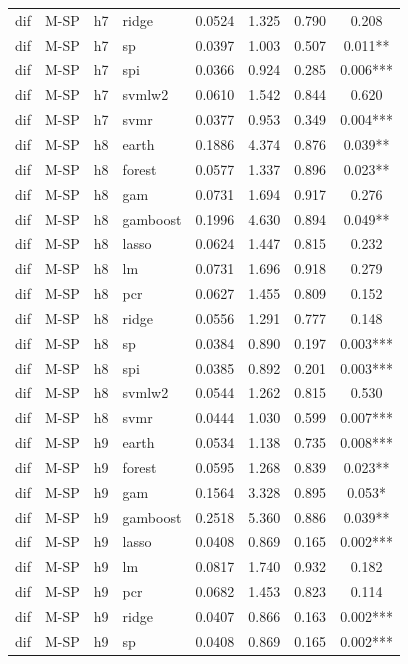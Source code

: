 \begin{ThreePartTable}
\begin{longtable}[t]{llclcccc}
dif & M-SP & h7 & ridge & 0.0524 & 1.325 & 0.790 & 0.208\\
dif & M-SP & h7 & sp & 0.0397 & 1.003 & 0.507 & 0.011**\\
dif & M-SP & h7 & spi & 0.0366 & 0.924 & 0.285 & 0.006***\\
dif & M-SP & h7 & svmlw2 & 0.0610 & 1.542 & 0.844 & 0.620\\
dif & M-SP & h7 & svmr & 0.0377 & 0.953 & 0.349 & 0.004***\\
\addlinespace
dif & M-SP & h8 & earth & 0.1886 & 4.374 & 0.876 & 0.039**\\
dif & M-SP & h8 & forest & 0.0577 & 1.337 & 0.896 & 0.023**\\
dif & M-SP & h8 & gam & 0.0731 & 1.694 & 0.917 & 0.276\\
dif & M-SP & h8 & gamboost & 0.1996 & 4.630 & 0.894 & 0.049**\\
dif & M-SP & h8 & lasso & 0.0624 & 1.447 & 0.815 & 0.232\\
dif & M-SP & h8 & lm & 0.0731 & 1.696 & 0.918 & 0.279\\
dif & M-SP & h8 & pcr & 0.0627 & 1.455 & 0.809 & 0.152\\
dif & M-SP & h8 & ridge & 0.0556 & 1.291 & 0.777 & 0.148\\
dif & M-SP & h8 & sp & 0.0384 & 0.890 & 0.197 & 0.003***\\
dif & M-SP & h8 & spi & 0.0385 & 0.892 & 0.201 & 0.003***\\
dif & M-SP & h8 & svmlw2 & 0.0544 & 1.262 & 0.815 & 0.530\\
dif & M-SP & h8 & svmr & 0.0444 & 1.030 & 0.599 & 0.007***\\
\addlinespace
dif & M-SP & h9 & earth & 0.0534 & 1.138 & 0.735 & 0.008***\\
dif & M-SP & h9 & forest & 0.0595 & 1.268 & 0.839 & 0.023**\\
dif & M-SP & h9 & gam & 0.1564 & 3.328 & 0.895 & 0.053*\\
dif & M-SP & h9 & gamboost & 0.2518 & 5.360 & 0.886 & 0.039**\\
dif & M-SP & h9 & lasso & 0.0408 & 0.869 & 0.165 & 0.002***\\
dif & M-SP & h9 & lm & 0.0817 & 1.740 & 0.932 & 0.182\\
dif & M-SP & h9 & pcr & 0.0682 & 1.453 & 0.823 & 0.114\\
dif & M-SP & h9 & ridge & 0.0407 & 0.866 & 0.163 & 0.002***\\
dif & M-SP & h9 & sp & 0.0408 & 0.869 & 0.165 & 0.002***\\

\end{longtable}
\end{ThreePartTable}
